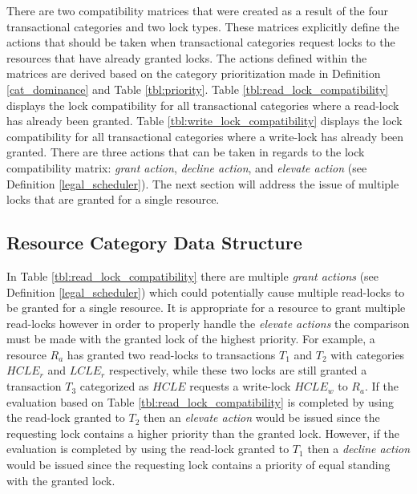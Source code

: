 \documentclass[conference]{IEEEtran}
\begin{document}
There are two compatibility matrices that were created as a result of the four transactional categories and two lock types. These matrices explicitly define the actions that should be taken when transactional categories request locks to the resources that have already granted locks. The actions defined within the matrices are derived based on the category prioritization made in Definition \ref{cat_dominance} and Table \ref{tbl:priority}. Table \ref{tbl:read_lock_compatibility} displays the lock compatibility for all transactional categories where a read-lock has already been granted. Table \ref{tbl:write_lock_compatibility} displays the lock compatibility for all transactional categories where a write-lock has already been granted. There are three actions that can be taken in regards to the lock compatibility matrix: \textit{grant action}, \textit{decline action}, and \textit{elevate action} (see Definition \ref{legal_scheduler}). The next section will address the issue of multiple locks that are granted for a single resource.

\subsection{Resource Category Data Structure}
\label{RCDS}

In Table \ref{tbl:read_lock_compatibility} there are multiple \textit{grant actions} (see Definition \ref{legal_scheduler}) which could potentially cause multiple read-locks to be granted for a single resource. It is appropriate for a resource to grant multiple read-locks however in order to properly handle the \textit{elevate actions} the comparison must be made with the granted lock of the highest priority. For example, a resource $R_{a}$ has granted two read-locks to transactions $T_{1}$ and $T_{2}$ with categories $HCLE_{r}$ and $LCLE_{r}$ respectively, while these two locks are still granted a transaction $T_{3}$ categorized as $HCLE$ requests a write-lock $HCLE_{w}$ to $R_{a}$. If the evaluation based on Table \ref{tbl:read_lock_compatibility} is completed by using the read-lock granted to $T_{2}$ then an \textit{elevate action} would be issued since the requesting lock contains a higher priority than the granted lock. However, if the evaluation is completed by using the read-lock granted to $T_{1}$ then a \textit{decline action} would be issued since the requesting lock contains a priority of equal standing with the granted lock.
\end{document}
